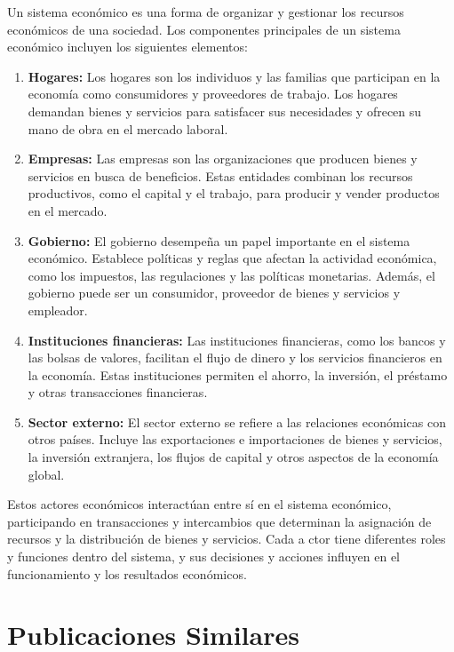 \documentclass[
  jou,
  floatsintext,
  longtable,
  a4paper,
  nolmodern,
  notxfonts,
  notimes,
  12pt,
  colorlinks=true,linkcolor=blue,citecolor=blue,urlcolor=blue]{apa7}
\begin{document}
Un sistema económico es una forma de organizar y gestionar los recursos
económicos de una sociedad. Los componentes principales de un sistema
económico incluyen los siguientes elementos:

\begin{enumerate}
\def\labelenumi{\arabic{enumi}.}
\item
  \textbf{Hogares:} Los hogares son los individuos y las familias que
  participan en la economía como consumidores y proveedores de trabajo.
  Los hogares demandan bienes y servicios para satisfacer sus
  necesidades y ofrecen su mano de obra en el mercado laboral.
\item
  \textbf{Empresas:} Las empresas son las organizaciones que producen
  bienes y servicios en busca de beneficios. Estas entidades combinan
  los recursos productivos, como el capital y el trabajo, para producir
  y vender productos en el mercado.
\item
  \textbf{Gobierno:} El gobierno desempeña un papel importante en el
  sistema económico. Establece políticas y reglas que afectan la
  actividad económica, como los impuestos, las regulaciones y las
  políticas monetarias. Además, el gobierno puede ser un consumidor,
  proveedor de bienes y servicios y empleador.
\item
  \textbf{Instituciones financieras:} Las instituciones financieras,
  como los bancos y las bolsas de valores, facilitan el flujo de dinero
  y los servicios financieros en la economía. Estas instituciones
  permiten el ahorro, la inversión, el préstamo y otras transacciones
  financieras.
\item
  \textbf{Sector externo:} El sector externo se refiere a las relaciones
  económicas con otros países. Incluye las exportaciones e importaciones
  de bienes y servicios, la inversión extranjera, los flujos de capital
  y otros aspectos de la economía global.
\end{enumerate}

Estos actores económicos interactúan entre sí en el sistema económico,
participando en transacciones y intercambios que determinan la
asignación de recursos y la distribución de bienes y servicios. Cada a
ctor tiene diferentes roles y funciones dentro del sistema, y sus
decisiones y acciones influyen en el funcionamiento y los resultados
económicos.

\section{Publicaciones Similares}\label{publicaciones-similares}
\end{document}
